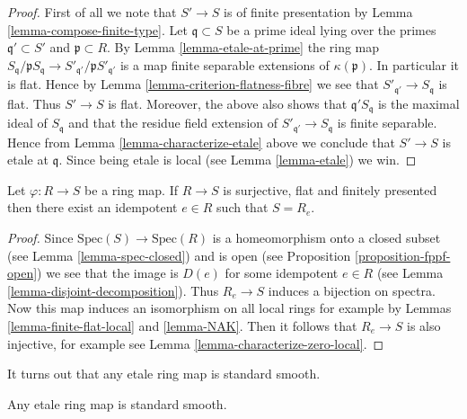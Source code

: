 \begin{proof}
First of all we note that $S' \to S$ is of finite presentation by
Lemma \ref{lemma-compose-finite-type}.
Let $\mathfrak q \subset S$ be a prime ideal lying over the primes
$\mathfrak q' \subset S'$ and $\mathfrak p \subset R$.
By Lemma \ref{lemma-etale-at-prime} the ring map
$S_{\mathfrak q}/\mathfrak p S_{\mathfrak q} \to
S'_{\mathfrak q'}/\mathfrak p S'_{\mathfrak q'}$
is a map finite separable extensions of $\kappa(\mathfrak p)$.
In particular it is flat. Hence by
Lemma \ref{lemma-criterion-flatness-fibre} we see that
$S'_{\mathfrak q'} \to S_{\mathfrak q}$ is flat. Thus $S' \to S$
is flat. Moreover, the above also shows that $\mathfrak q'S_{\mathfrak q}$
is the maximal ideal of $S_{\mathfrak q}$ and that the residue
field extension of $S'_{\mathfrak q'} \to S_{\mathfrak q}$ is
finite separable. Hence from Lemma \ref{lemma-characterize-etale}
above we conclude that $S' \to S$ is etale at $\mathfrak q$. Since
being etale is local (see Lemma \ref{lemma-etale}) we win.
\end{proof}



\begin{lemma}
\label{lemma-surjective-flat-finitely-presented}
Let $\varphi :R \to S$ be a ring map. If $R \to S$ is surjective, flat and
finitely presented then there exist an idempotent $e \in R$ such that
$S = R_e$.
\end{lemma}

\begin{proof}
Since $\text{Spec}(S) \to \text{Spec}(R)$ is a homeomorphism
onto a closed subset (see Lemma \ref{lemma-spec-closed}) and
is open (see Proposition \ref{proposition-fppf-open}) we see that
the image is $D(e)$ for some idempotent $e \in R$ (see
Lemma \ref{lemma-disjoint-decomposition}). Thus $R_e \to S$
induces a bijection on spectra. Now this map induces an isomorphism
on all local rings for example by
Lemmas \ref{lemma-finite-flat-local} and \ref{lemma-NAK}.
Then it follows that $R_e \to S$ is also injective, for example
see Lemma \ref{lemma-characterize-zero-local}.
\end{proof}

\noindent
It turns out that any etale ring map is standard smooth.

\begin{lemma}
\label{lemma-etale-standard-smooth}
Any etale ring map is standard smooth.
\end{lemma}

